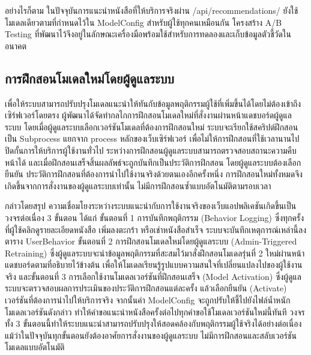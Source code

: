 อย่างไรก็ตาม ในปัจจุบันการแนะนำหนังสือที่ให้บริการจริงผ่าน /api/recommendations/ ยังใช้โมเดลเดียวตามที่กำหนดไว้ใน ModelConfig สำหรับผู้ใช้ทุกคนเหมือนกัน โครงสร้าง A/B Testing ที่พัฒนาไว้จึงอยู่ในลักษณะเครื่องมือพร้อมใช้สำหรับการทดลองและเก็บข้อมูลตัวชี้วัดในอนาคต 

\subsection{การฝึกสอนโมเดลใหม่โดยผู้ดูแลระบบ}

เพื่อให้ระบบสามารถปรับปรุงโมเดลแนะนำให้ทันกับข้อมูลพฤติกรรมผู้ใช้ที่เพิ่มขึ้นได้โดยไม่ต้องเข้าถึงเซิร์ฟเวอร์โดยตรง ผู้พัฒนาได้จัดทำกลไกการฝึกสอนโมเดลใหม่ที่สั่งงานผ่านหน้าแดชบอร์ดผู้ดูแลระบบ โดยเมื่อผู้ดูแลระบบเลือกเวอร์ชันโมเดลที่ต้องการฝึกสอนใหม่ ระบบจะเรียกใช้สคริปต์ฝึกสอน เป็น Subprocess แยกจาก process หลักของเว็บเซิร์ฟเวอร์ เพื่อไม่ให้การฝึกสอนที่ใช้เวลานานไปปิดกั้นการให้บริการผู้ใช้งานทั่วไป ระหว่างการฝึกสอนผู้ดูแลระบบสามารถตรวจสอบสถานะความคืบหน้าได้ และเมื่อฝึกสอนเสร็จสิ้นผลลัพธ์จะถูกบันทึกเป็นประวัติการฝึกสอน โดยผู้ดูแลระบบต้องเลือกยืนยัน ประวัติการฝึกสอนที่ต้องการนำไปใช้งานจริงด้วยตนเองอีกครั้งหนึ่ง การฝึกสอนใหม่ทั้งหมดจึงเกิดขึ้นจากการสั่งงานของผู้ดูแลระบบเท่านั้น ไม่มีการฝึกสอนซ้ำแบบอัตโนมัติตามรอบเวลา

กล่าวโดยสรุป ความเชื่อมโยงระหว่างระบบแนะนำกับการใช้งานจริงของเว็บแอปพลิเคชันเกิดขึ้นเป็นวงจรต่อเนื่อง 3 ขั้นตอน ได้แก่ ขั้นตอนที่ 1 การบันทึกพฤติกรรม (Behavior Logging) ซึ่งทุกครั้งที่ผู้ใช้คลิกดูรายละเอียดหนังสือ เพิ่มลงตะกร้า หรือเช่าหนังสือสำเร็จ ระบบจะบันทึกเหตุการณ์เหล่านี้ลงตาราง UserBehavior ขั้นตอนที่ 2 การฝึกสอนโมเดลใหม่โดยผู้ดูแลระบบ (Admin-Triggered Retraining) ซึ่งผู้ดูแลระบบจะนำข้อมูลพฤติกรรมที่สะสมไว้มาสั่งฝึกสอนโมเดลรุ่นที่ 2 ใหม่ผ่านหน้าแดชบอร์ดตามที่อธิบายไว้ข้างต้น เพื่อให้โมเดลเรียนรู้รูปแบบความสนใจที่เปลี่ยนแปลงไปของผู้ใช้งานจริง และขั้นตอนที่ 3 การเลือกใช้งานโมเดลเวอร์ชันที่ฝึกสอนเสร็จ (Model Activation) ซึ่งผู้ดูแลระบบจะตรวจสอบผลการประเมินของประวัติการฝึกสอนแต่ละครั้ง แล้วเลือกยืนยัน (Activate) เวอร์ชันที่ต้องการนำไปให้บริการจริง จากนั้นค่า ModelConfig จะถูกปรับให้ชี้ไปยังไฟล์น้ำหนักโมเดลเวอร์ชันดังกล่าว ทำให้คำขอแนะนำหนังสือครั้งต่อไปทุกคำขอใช้โมเดลเวอร์ชันใหม่นี้ทันที วงจรทั้ง 3 ขั้นตอนนี้ทำให้ระบบแนะนำสามารถปรับปรุงให้สอดคล้องกับพฤติกรรมผู้ใช้จริงได้อย่างต่อเนื่อง แม้ว่าในปัจจุบันทุกขั้นตอนยังต้องอาศัยการสั่งงานของผู้ดูแลระบบ ไม่มีการฝึกสอนและสลับเวอร์ชันโมเดลแบบอัตโนมัติ

